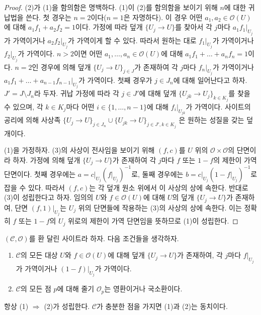 \begin{proof}
(2)가 (1)을 함의함은 명백하다. (1)이 (2)를 함의함을 보이기 위해
$n$에 대한 귀납법을 쓴다. 첫 경우는 $n = 2$이다($n = 1$은 자명하다).
이 경우 어떤 $a_1, a_2 \in \mathcal{O}(U)$에 대해
$a_1f_1 + a_2f_2 = 1$이다. 가정에 따라 덮개 $\{U_j \to U\}$를 찾아서
각 $j$마다 $a_1f_1|_{U_j}$가 가역이거나 $a_2f_2|_{U_j}$가 가역이게
할 수 있다. 따라서 원하는 대로 $f_1|_{U_j}$가 가역이거나
$f_2|_{U_j}$가 가역이다. $n > 2$이면 어떤
$a_1, \ldots, a_n \in \mathcal{O}(U)$에 대해
$a_1f_1 + \ldots + a_nf_n = 1$이다. $n = 2$인 경우에 의해 덮개
$\{U_j \to U\}_{j \in J}$가 존재하여 각 $j$마다 $f_n|_{U_j}$가
가역이거나 $a_1f_1 + \ldots + a_{n - 1}f_{n - 1}|_{U_j}$가 가역이다.
첫째 경우가 $j \in J_n$에 대해 일어난다고 하자.
$J' = J \setminus J_n$라 두자. 귀납 가정에 따라 각 $j \in J'$에 대해
덮개 $\{U_{jk} \to U_j\}_{k \in K_j}$를 찾을 수 있으며, 각
$k \in K_j$마다 어떤 $i \in \{1, \ldots, n - 1\}$에 대해
$f_i|_{U_{jk}}$가 가역이다. 사이트의 공리에 의해 사상족
$\{U_j \to U\}_{j \in J_n} \cup \{U_{jk} \to U\}_{j \in J', k \in K_j}$
은 원하는 성질을 갖는 덮개이다.

\medskip\noindent
(1)을 가정하자. (3)의 사상이 전사임을 보이기 위해
$(f, c)$를 $U$ 위의 $\mathcal{O} \times \mathcal{O}$의 단면이라 하자.
가정에 의해 덮개 $\{U_j \to U\}$가 존재하여 각 $j$마다 $f$ 또는
$1 - f$의 제한이 가역 단면이다. 첫째 경우에는
$a = c|_{U_j} (f|_{U_j})^{-1}$로, 둘째 경우에는
$b = c|_{U_j} (1 - f|_{U_j})^{-1}$로 잡을 수 있다.
따라서 $(f, c)$는 각 덮개 원소 위에서 이 사상의 상에 속한다.
반대로 (3)이 성립한다고 하자. 임의의 $U$와 $f \in \mathcal{O}(U)$에 대해
$U$의 덮개 $\{U_j \to U\}$가 존재하여, 단면 $(f, 1)|_{U_j}$는
$U_j$ 위의 단면들에 작용하는 (3)의 사상의 상에 속한다. 이는 정확히
$f$ 또는 $1 - f$의 $U_j$ 위로의 제한이 가역 단면임을 뜻하므로
(1)이 성립한다.
\end{proof}

\begin{lemma}
\label{lemma-locally-ringed-stalk}
$(\mathcal{C}, \mathcal{O})$를 환 달린 사이트라 하자.
다음 조건들을 생각하자.
\begin{enumerate}
\item $\mathcal{C}$의 모든 대상 $U$와 $f \in \mathcal{O}(U)$에 대해
덮개 $\{U_j \to U\}$가 존재하여, 각 $j$마다 $f|_{U_j}$가 가역이거나
$(1 - f)|_{U_j}$가 가역이다.
\item $\mathcal{C}$의 모든 점 $p$에 대해 줄기 $\mathcal{O}_p$는
영환이거나 국소환이다.
\end{enumerate}
항상 (1) $\Rightarrow$ (2)가 성립한다. $\mathcal{C}$가 충분한 점을 가지면
(1)과 (2)는 동치이다.
\end{lemma}

